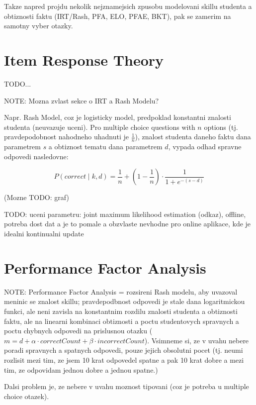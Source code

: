 \documentclass[a4paper, 12pt, twoside]{fithesis2}		%
\renewcommand{\_}{\leavevmode \kern0.07em\vbox{\hrule width0.4em}}
\newcounter{choice}
\begin{document}
Takze napred projdu nekolik nejznamejsich zpusobu modelovani skillu studenta a obtiznosti faktu (IRT/Rash, PFA, ELO, PFAE, BKT), pak se zamerim na samotny vyber otazky.


\section{Item Response Theory}
\label{sec:irt}


TODO...

NOTE: Mozna zvlast sekce o IRT a Rash Modelu?

Napr. Rash Model, coz je logisticky model, predpoklad konstantni znalosti studenta (neuvazuje uceni). Pro multiple choice questions with $n$ options (tj. pravdepodobnost nahodneho uhadnuti je $\frac{1}{n}$), znalost studenta daneho faktu dana parametrem $s$ a obtiznost tematu dana parametrem $d$, vypada odhad spravne odpovedi nasledovne:

$$
P(correct \mid k, d) = \frac{1}{n} + \left( 1 - \frac{1}{n} \right) \cdot \frac{1}{1 + e^{-(s - d)}}
$$

(Mozne TODO: graf)

TODO: uceni parametru: joint maximum likelihood estimation (odkaz), offline, potreba dost dat a je to pomale a obzvlaste nevhodne pro online aplikace, kde je idealni kontinualni update


\section{Performance Factor Analysis}
\label{sec:pfa}

NOTE: Performance Factor Analysis = rozsireni Rash modelu, aby uvazoval meninic se znalost skillu; pravdepodbnost odpovedi je stale dana logaritmickou funkci, ale neni zavisla na konstantnim rozdilu znalosti studenta a obtiznosti faktu, ale na linearni kombinaci obtiznosti a poctu studentovych spravnych a poctu chybnych odpovedi na prislusnou otazku ($m = d + \alpha \cdot correctCount + \beta \cdot incorrectCount$).
Vsimneme si, ze v uvahu nebere poradi spravnych a spatnych odpovedi, pouze jejich obsolutni pocet (tj. neumi rozlisit mezi tim, ze jsem 10 krat odpovedel spatne a pak 10 krat dobre a mezi tim, ze odpovidam jednou dobre a jednou spatne.)

Dalsi problem je, ze nebere v uvahu moznost tipovani (coz je potreba u multiple choice otazek).
\end{document}
